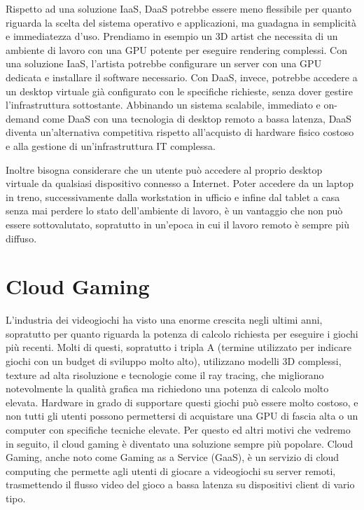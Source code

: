 \documentclass[12pt,a4paper,openright,twoside]{book}
\begin{document}
Rispetto ad una soluzione IaaS, DaaS potrebbe essere meno flessibile per quanto riguarda la scelta del sistema operativo e applicazioni, ma guadagna in semplicità e immediatezza d'uso.
Prendiamo in esempio un 3D artist che necessita di un ambiente di lavoro con una GPU potente per eseguire rendering complessi. Con una soluzione IaaS, l'artista potrebbe configurare un server con una GPU dedicata e installare il software necessario. Con DaaS, invece, potrebbe accedere a un desktop virtuale già configurato con le specifiche richieste, senza dover gestire l'infrastruttura sottostante.
Abbinando un sistema scalabile, immediato e on-demand come DaaS con una tecnologia di desktop remoto a bassa latenza, DaaS diventa un'alternativa competitiva rispetto all'acquisto di hardware fisico costoso e alla gestione di un'infrastruttura IT complessa.

Inoltre bisogna considerare che un utente può accedere al proprio desktop virtuale da qualsiasi dispositivo connesso a Internet.
Poter accedere da un laptop in treno, successivamente dalla workstation in ufficio e infine dal tablet a casa senza mai perdere lo stato dell'ambiente di lavoro, è un vantaggio che non può essere sottovalutato, sopratutto in un'epoca in cui il lavoro remoto è sempre più diffuso.

\section{Cloud Gaming}
\label{sec:cloud-gaming}
L'industria dei videogiochi ha visto una enorme crescita negli ultimi anni, sopratutto per quanto riguarda la potenza di calcolo richiesta per eseguire i giochi più recenti. Molti di questi, sopratutto i tripla A (termine utilizzato per indicare giochi con un budget di sviluppo molto alto), utilizzano modelli 3D complessi, texture ad alta risoluzione e tecnologie come il ray tracing, che migliorano notevolmente la qualità grafica ma richiedono una potenza di calcolo molto elevata.
Hardware in grado di supportare questi giochi può essere molto costoso, e non tutti gli utenti possono permettersi di acquistare una GPU di fascia alta o un computer con specifiche tecniche elevate.
Per questo ed altri motivi che vedremo in seguito, il cloud gaming è diventato una soluzione sempre più popolare.
Cloud Gaming, anche noto come Gaming as a Service (GaaS), è un servizio di cloud computing che permette agli utenti di giocare a videogiochi su server remoti, trasmettendo il flusso video del gioco a bassa latenza su dispositivi client di vario tipo. \cite{HARLE2023}
\end{document}
